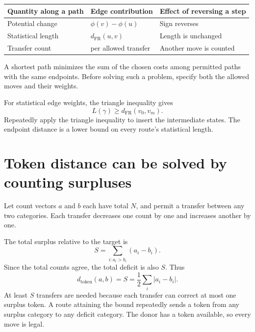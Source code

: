 \documentclass[11pt,oneside,openany]{book}
\theoremstyle{definition}
\theoremstyle{remark}
\numberwithin{equation}{chapter}
\begin{document}
\begin{longtable}[]{@{}
  >{\raggedright\arraybackslash}p{}
  >{\raggedright\arraybackslash}p{}
  >{\raggedright\arraybackslash}p{}@{}}
\toprule\noalign{}
\begin{minipage}[b]{\linewidth}\raggedright
Quantity along a path
\end{minipage} & \begin{minipage}[b]{\linewidth}\raggedright
Edge contribution
\end{minipage} & \begin{minipage}[b]{\linewidth}\raggedright
Effect of reversing a step
\end{minipage} \\
\midrule\noalign{}
\endhead
\bottomrule\noalign{}
\endlastfoot
Potential change & \(\phi(v)-\phi(u)\) & Sign reverses \\
Statistical length & \(d_{\mathrm{FR}}(u,v)\) & Length is unchanged \\
Transfer count & 1 per allowed transfer & Another move is counted \\
\end{longtable}

A shortest path minimizes the sum of the chosen costs among permitted paths with the same endpoints. Before solving such a problem, specify both the allowed moves and their weights.

For statistical edge weights, the triangle inequality gives \[L(\gamma)\geq d_{\mathrm{FR}}(v_0,v_m).\] Repeatedly apply the triangle inequality to insert the intermediate states. The endpoint distance is a lower bound on every route's statistical length.

\section{Token distance can be solved by counting surpluses}\label{ch08-token-distance-can-be-solved-by-counting-surpluses}

Let count vectors \(a\) and \(b\) each have total \(N\), and permit a transfer between any two categories. Each transfer decreases one count by one and increases another by one.

The total surplus relative to the target is \[S=\sum_{i:a_i>b_i}(a_i-b_i).\] Since the total counts agree, the total deficit is also \(S\). Thus \[\boxed{d_{\mathrm{token}}(a,b)=S=\frac12\sum_i|a_i-b_i|.}\] At least \(S\) transfers are needed because each transfer can correct at most one surplus token. A route attaining the bound repeatedly sends a token from any surplus category to any deficit category. The donor has a token available, so every move is legal.
\end{document}
